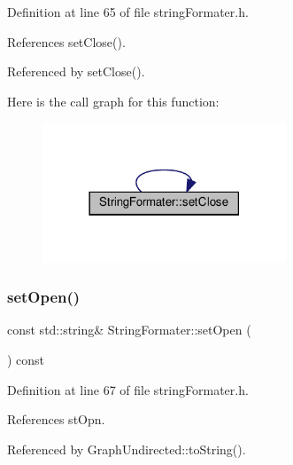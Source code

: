 Definition at line 65 of file string\+Formater.\+h.



References set\+Close().



Referenced by set\+Close().

Here is the call graph for this function\+:
\nopagebreak
\begin{figure}[H]
\begin{center}
\leavevmode
\includegraphics[width=206pt]{classStringFormater_af8e955e219e2666e2072783bcfb54cc6_cgraph}
\end{center}
\end{figure}
\mbox{\label{classStringFormater_a395cdce03292513a02a9622c920478b5}} 
\subsubsection{\texorpdfstring{set\+Open()}{setOpen()}\hspace{0.1cm}{\footnotesize\ttfamily [1/2]}}
{\footnotesize\ttfamily const std\+::string\& String\+Formater\+::set\+Open (\begin{DoxyParamCaption}{ }\end{DoxyParamCaption}) const\hspace{0.3cm}{\ttfamily [inline]}}



Definition at line 67 of file string\+Formater.\+h.



References st\+Opn.



Referenced by Graph\+Undirected\+::to\+String().

\mbox{\label{classStringFormater_a2b7df7412f7e0993532525aed90ca258}} 
